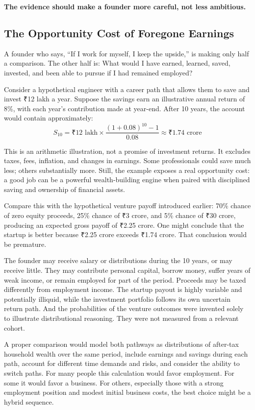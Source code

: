 \textbf{The evidence should make a founder more careful, not less ambitious.}

\subsection{The Opportunity Cost of Foregone Earnings}

A founder who says, ``If I work for myself, I keep the upside,'' is making only half a comparison. The other half is: What would I have earned, learned, saved, invested, and been able to pursue if I had remained employed?

Consider a hypothetical engineer with a career path that allows them to save and invest ₹12 lakh a year. Suppose the savings earn an illustrative annual return of 8\%, with each year's contribution made at year-end. After 10 years, the account would contain approximately:
\begin{equation}
  S_{10} = ₹12\text{ lakh} \times \frac{(1 + 0.08)^{10} - 1}{0.08} \approx ₹1.74\text{ crore} \label{eq:counterfactual-savings}
\end{equation}

This is an arithmetic illustration, not a promise of investment returns. It excludes taxes, fees, inflation, and changes in earnings. Some professionals could save much less; others substantially more. Still, the example exposes a real opportunity cost: a good job can be a powerful wealth-building engine when paired with disciplined saving and ownership of financial assets.

Compare this with the hypothetical venture payoff introduced earlier: 70\% chance of zero equity proceeds, 25\% chance of ₹3 crore, and 5\% chance of ₹30 crore, producing an expected gross payoff of ₹2.25 crore. One might conclude that the startup is better because ₹2.25 crore exceeds ₹1.74 crore. That conclusion would be premature.

The founder may receive salary or distributions during the 10 years, or may receive little. They may contribute personal capital, borrow money, suffer years of weak income, or remain employed for part of the period. Proceeds may be taxed differently from employment income. The startup payout is highly variable and potentially illiquid, while the investment portfolio follows its own uncertain return path. And the probabilities of the venture outcomes were invented solely to illustrate distributional reasoning. They were not measured from a relevant cohort.

A proper comparison would model both pathways as distributions of after-tax household wealth over the same period, include earnings and savings during each path, account for different time demands and risks, and consider the ability to switch paths. For many people this calculation would favor employment. For some it would favor a business. For others, especially those with a strong employment position and modest initial business costs, the best choice might be a hybrid sequence.

